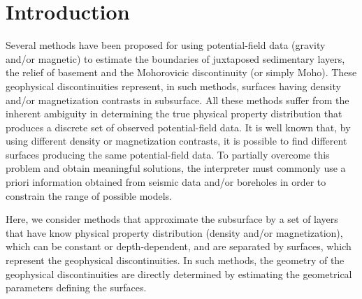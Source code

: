 \documentclass[manuscript]{geophysics}
\begin{document}
\section{Introduction}

Several methods have been proposed for using potential-field data
(gravity and/or magnetic) to estimate the boundaries of juxtaposed sedimentary layers, 
the relief of basement and the Mohorovicic discontinuity (or simply Moho).
These geophysical discontinuities represent, in such methods, 
surfaces having density and/or magnetization contrasts in subsurface.
All these methods suffer from the inherent ambiguity \citep{skeels1947, roy1962} in
determining the true physical property distribution that produces a discrete set of
observed potential-field data. 
It is well known that, by using different density or magnetization contrasts, 
it is possible to find different surfaces producing the same potential-field data. 
To partially overcome this problem and obtain meaningful solutions, the interpreter
must commonly use a priori information obtained from seismic data and/or boreholes in
order to constrain the range of possible models.

Here, we consider methods that approximate the subsurface by a set of layers that have
know physical property distribution (density and/or magnetization), which can be
constant or depth-dependent, and are separated by surfaces, which represent the
geophysical discontinuities.
In such methods, the geometry of the geophysical discontinuities are directly determined
by estimating the geometrical parameters defining the surfaces.
\end{document}
